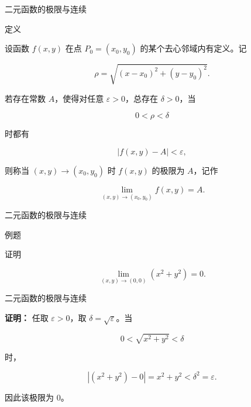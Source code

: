 \documentclass[aspectratio=169,10pt,fontset=fandol]{ctexbeamer}
\begin{document}
\begin{frame}[t,fragile]{二元函数的极限与连续}
\normalsize
\begin{block}{定义}
{\normalsize


	设函数 \(f(x,y)\) 在点 \(P_0=(x_0,y_0)\) 的某个去心邻域内有定义。记

	\[

	\rho=\sqrt{(x-x_0)^2+(y-y_0)^2}.

	\]

	若存在常数 \(A\)，使得对任意 \(\varepsilon>0\)，总存在 \(\delta>0\)，当

	\[

	0<\rho<\delta

	\]

	时都有

	\[

	|f(x,y)-A|<\varepsilon,

	\]

	则称当 \((x,y)\to(x_0,y_0)\) 时 \(f(x,y)\) 的极限为 \(A\)，记作

	\[

	\lim_{(x,y)\to(x_0,y_0)}f(x,y)=A.

	\]


}
\end{block}
\end{frame}
\begin{frame}[t,fragile]{二元函数的极限与连续}
\normalsize
\begin{block}{例题}
{\normalsize


	证明

	\[

	\lim_{(x,y)\to(0,0)}(x^2+y^2)=0.

	\]


}
\end{block}
\end{frame}
\begin{frame}[t,fragile]{二元函数的极限与连续}
\normalsize
{\normalsize
\textbf{证明：}
任取 \(\varepsilon>0\)，取 \(\delta=\sqrt{\varepsilon}\)。当

	\[

	0<\sqrt{x^2+y^2}<\delta

	\]

	时，

	\[

	|(x^2+y^2)-0|=x^2+y^2<\delta^2=\varepsilon.

	\]

	因此该极限为 \(0\)。


}
\end{frame}
\end{document}
